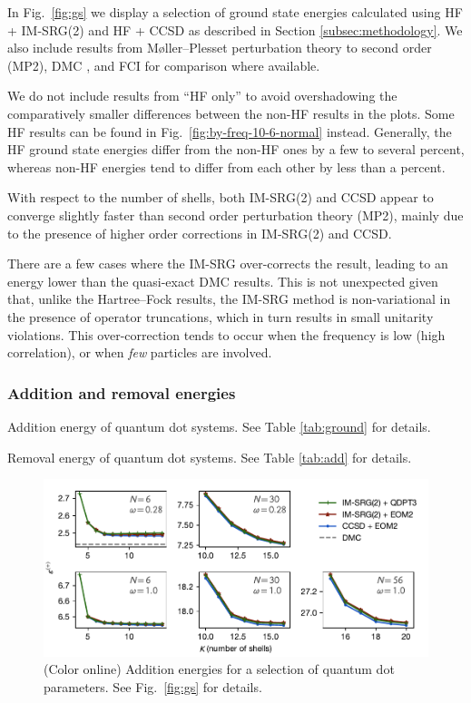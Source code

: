 In Fig.\ \ref{fig:gs} we display a selection of ground state energies calculated using HF + IM-SRG(2) and HF + CCSD as described in Section \ref{subsec:methodology}.  We also include results from M\o ller--Plesset perturbation theory to second order (MP2), DMC \cite{hoegberget2013thesis}, and FCI \cite{olsen2013thesis} for comparison where available.

We do not include results from ``HF only'' to avoid overshadowing the comparatively smaller differences between the non-HF results in the plots.  Some HF results can be found in Fig.\ \ref{fig:by-freq-10-6-normal} instead.  Generally, the HF ground state energies differ from the non-HF ones by a few to several percent, whereas non-HF energies tend to differ from each other by less than a percent.

With respect to the number of shells, both IM-SRG(2) and CCSD appear to converge slightly faster than second order perturbation theory (MP2), mainly due to the presence of higher order corrections in IM-SRG(2) and CCSD.

There are a few cases where the IM-SRG over-corrects the result, leading to an energy lower than the quasi-exact DMC results.  This is not unexpected given that, unlike the Hartree--Fock results, the IM-SRG method is non-variational in the presence of operator truncations, which in turn results in small unitarity violations.  This over-correction tends to occur when the frequency is low (high correlation), or when \emph{few} particles are involved.

\subsubsection{Addition and removal energies}

\begin{table}
  \centering
  \caption{Addition energy of quantum dot systems.  See Table \ref{tab:ground} for details.}
  \label{tab:add}
  
\end{table}

\begin{table}
  \centering
  \caption{Removal energy of quantum dot systems.  See Table \ref{tab:add} for details.}
  \label{tab:rm}
  
\end{table}

\begin{figure}
  \centering
  \includegraphics{fig-add2.pdf}
  \caption{(Color online) Addition energies for a selection of quantum dot parameters.  See Fig.\ \ref{fig:gs} for details.}
  \label{fig:add}
\end{figure}

